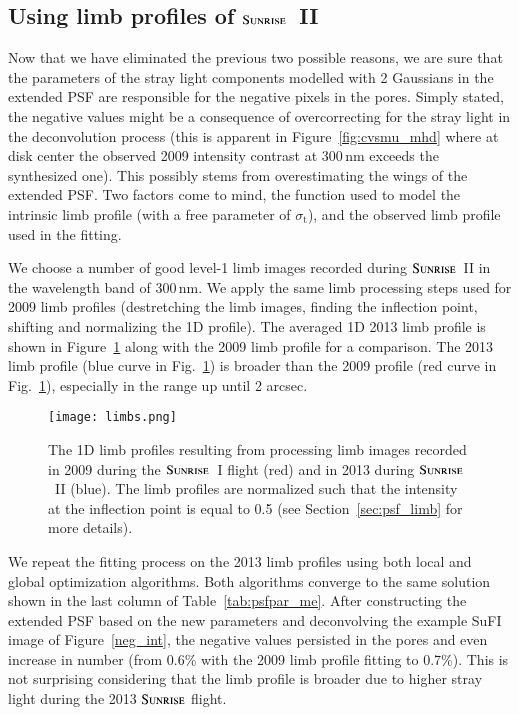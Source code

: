 \documentclass[goettingen, gauss, print]{thesis}
\begin{document}
\subsection{Using limb profiles of $\textsc{Sunrise}$~II}
Now that we have eliminated the previous two possible reasons, we are sure that the parameters of the stray light components modelled with 2 Gaussians in the extended PSF are responsible for the negative pixels in the pores. Simply stated, the negative values might be a consequence of overcorrecting for the stray light in the deconvolution process (this is apparent in Figure~\ref{fig:cvsmu_mhd} where at disk center the observed 2009 intensity contrast at 300\,nm exceeds the synthesized one). This possibly stems from overestimating the wings of the extended PSF. Two factors come to mind, the function used to model the intrinsic limb profile (with a free parameter of $\sigma_{\mathrm{t}}$), and the observed limb profile used in the fitting.

We choose a number of good level-1 limb images recorded during $\textsc{Sunrise}$~II in the wavelength band of 300\,nm. We apply the same limb processing steps used for 2009 limb profiles (destretching the limb images, finding the inflection point, shifting and normalizing the 1D profile). The averaged 1D 2013 limb profile is shown in Figure~\ref{limbs} along with the 2009 limb profile for a comparison. The 2013 limb profile (blue curve in Fig.~\ref{limbs}) is broader than the 2009 profile (red curve in Fig.~\ref{limbs}), especially in the range up until 2 arcsec. %

\begin{figure}
\centering
\texttt{[image: limbs.png]}
\caption{The 1D limb profiles resulting from processing limb images recorded in 2009 during the $\textsc{Sunrise}$~I flight (red) and in 2013 during $\textsc{Sunrise}$~II (blue). The limb profiles are normalized such that the intensity at the inflection point is equal to 0.5 (see Section~\ref{sec:psf_limb} for more details). }
\label{limbs}
\end{figure}

We repeat the fitting process on the 2013 limb profiles using both local and global optimization algorithms. Both algorithms converge to the same solution shown in the last column of Table~\ref{tab:psfpar_me}.
After constructing the extended PSF based on the new parameters and deconvolving the example SuFI image of Figure~\ref{neg_int}, the negative values persisted in the pores and even increase in number (from 0.6\% with the 2009 limb profile fitting to 0.7\%). This is not surprising considering that the limb profile is broader due to higher stray light during the 2013 $\textsc{Sunrise}$ flight.
\end{document}

